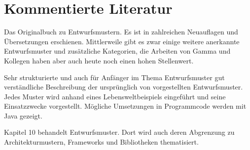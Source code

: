 \section{Kommentierte Literatur}
\label{sec:Kap-10.5}


{Das Originalbuch zu Entwurfsmustern. Es ist in zahlreichen Neuauflagen und Übersetzungen erschienen. Mittlerweile gibt es zwar einige weitere anerkannte Entwurfsmuster und zusätzliche Kategorien, die Arbeiten von Gamma und Kollegen haben aber auch heute noch einen hohen Stellenwert.} 

{Sehr strukturierte und auch für Anfänger im Thema Entwurfsmuster gut verständ\-liche Beschreibung der ursprünglich von \cite{gam95} vorgestellten Entwurfsmuster. Jedes Muster wird anhand eines Lebensweltbeispiels eingeführt und seine Einsatzzwecke vorgestellt. Mögliche Umsetzungen in Programmcode werden mit Java gezeigt.}

{Kapitel 10 behandelt Entwurfsmuster. Dort wird auch deren Abgrenzung zu 
\linebreak %
Architekturmustern, Frameworks und Bibliotheken thematisiert.}



